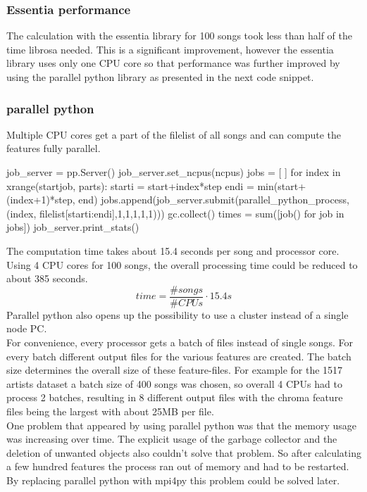 \subsubsection{Essentia performance}

The calculation with the essentia library for 100 songs took less than half of the time librosa needed. This is a significant improvement, however the essentia library uses only one CPU core so that performance was further improved by using the parallel python library as presented in the next code snippet.

\subsubsection{parallel python}

Multiple CPU cores get a part of the filelist of all songs and can compute the features fully parallel.
\begin{pythonCode}[frame=single,label={lst:pp},caption={parallel python},captionpos=b]
job_server = pp.Server()
job_server.set_ncpus(ncpus)
jobs = [ ]
for index in xrange(startjob, parts):
	starti = start+index*step
	endi = min(start+(index+1)*step, end)
	jobs.append(job_server.submit(parallel_python_process, (index, 
		filelist[starti:endi],1,1,1,1,1)))
	gc.collect()
times = sum([job() for job in jobs])
job_server.print_stats()
\end{pythonCode}
The computation time takes about 15.4 seconds per song and processor core. Using 4 CPU cores for 100 songs, the overall processing time could be reduced to about 385 seconds. 
\begin{equation} \label{eq:parallelp}
time = \frac{\#songs}{\#CPUs} \cdot 15.4s
\end{equation}
Parallel python also opens up the possibility to use a cluster instead of a single node PC.\\
For convenience, every processor gets a batch of files instead of single songs. For every batch different output files for the various features are created. The batch size determines the overall size of these feature-files. For example for the 1517 artists dataset a batch size of 400 songs was chosen, so overall 4 CPUs had to process 2 batches, resulting in 8 different output files with the chroma feature files being the largest with about 25MB per file.\\
One problem that appeared by using parallel python was that the memory usage was increasing over time. The explicit usage of the garbage collector and the deletion of unwanted objects also couldn't solve that problem. So after calculating a few hundred features the process ran out of memory and had to be restarted. By replacing parallel python with mpi4py this problem could be solved later. 

